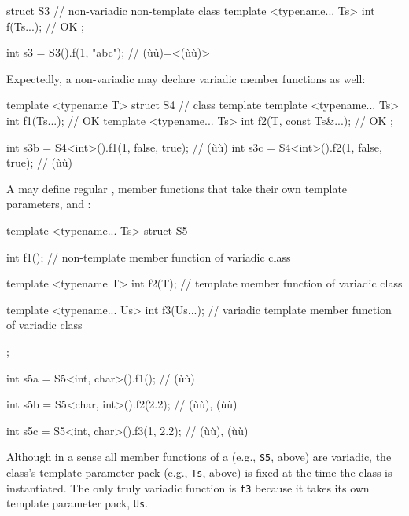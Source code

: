 \begin{emcppslisting}
struct S3                                 // non-variadic non-template class
{
    template <typename... Ts> int f(Ts...);  // OK
};

int s3 = S3().f(1, "abc");                // (ù{}ù)=<(ù{}ù)>
\end{emcppslisting}
    

\noindent Expectedly, a non-variadic  may declare variadic
member functions as well:

\begin{emcppslisting}
template <typename T>
struct S4                                            // class template
{
    template <typename... Ts> int f1(Ts...);            // OK
    template <typename... Ts> int f2(T, const Ts&...);  // OK
};

int s3b = S4<int>().f1(1, false, true);              // (ù{}ù)
int s3c = S4<int>().f2(1, false, true);              // (ù{}ù)
\end{emcppslisting}
    

\noindent A  may define regular , member functions that take their own template parameters,
and :

\begin{emcppslisting}
template <typename... Ts>
struct S5
{
    int f1();       // non-template member function of variadic class

    template <typename T>
    int f2(T);      // template member function of variadic class

    template <typename... Us>
    int f3(Us...);  // variadic template member function of variadic class
};

int s5a = S5<int, char>().f1();
    // (ù{}ù)

int s5b = S5<char, int>().f2(2.2);
    // (ù{}ù), (ù{}ù)

int s5c = S5<int, char>().f3(1, 2.2);
    // (ù{}ù), (ù{}ù)
\end{emcppslisting}
    

\noindent Although in a sense all member functions of a  (e.g., \lstinline!S5!, above) are variadic, the class's template
parameter pack (e.g., \lstinline!Ts!, above) is fixed at the time the class
is instantiated. The only truly variadic function is \lstinline!f3! because
it takes its own template parameter pack, \lstinline!Us!.

